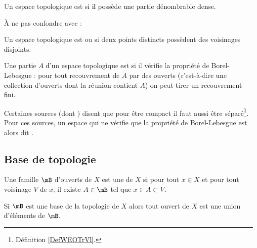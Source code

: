 \begin{definition}  \label{DefUADooqilFK}
    Un espace topologique est  si il possède une partie dénombrable dense.
\end{definition}
À ne pas confondre avec :
\begin{definition}  \label{DefWEOTrVl}
    Un espace topologique est  ou  si deux points distincts possèdent des voisinages disjoints.
\end{definition}

\begin{definition}  \label{DefJJVsEqs}
  Une partie $A$ d'un espace topologique est  si il vérifie la propriété de Borel-Lebesgue : pour tout recouvrement de $A$ par des ouverts (c'est-à-dire une collection d'ouverts dont la réunion contient $A$) on peut tirer un recouvrement fini.
\end{definition}
\begin{remark}
    Certaines sources (dont ) disent que pour être compact il faut aussi être séparé\footnote{Définition \ref{DefWEOTrVl}.}. Pour ces sources, un espace qui ne vérifie que la propriété de Borel-Lebesgue est alors dit .
\end{remark}

\subsection{Base de topologie}

\begin{definition}   \label{DefQELfbBEyiB}
    Une famille \( \mB\) d'ouverts de \( X\) est une  de \( X\) si pour tout \( x\in X\) et pour tout voisinage \( V\) de \( x\), il existe \( A\in \mB\) tel que \( x\in A\subset V\).
\end{definition}

\begin{proposition} \label{PropMMKBjgY}
    Si \( \mB\) est une base de la topologie de \( X\) alors tout ouvert de \( X\) est une union d'éléments de \( \mB\).
\end{proposition}

